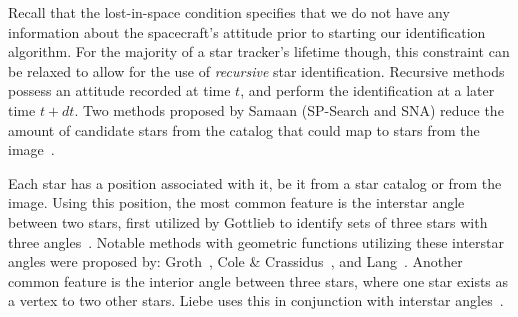 Recall that the lost-in-space condition specifies that we do not have any information about the spacecraft's attitude
prior to starting our identification algorithm.
For the majority of a star tracker's lifetime though, this constraint can be relaxed to allow for the use of
\textit{recursive} star identification.
Recursive methods possess an attitude recorded at time $t$, and perform the identification at a later time $t + dt$.
Two methods proposed by Samaan (SP-Search and SNA) reduce the amount of candidate stars from the catalog that could
map to stars from the image~\cite{samaan:recursiveMode}.

Each star has a position associated with it, be it from a star catalog or from the image.
Using this position, the most common feature is the interstar angle between two stars, first utilized by Gottlieb to
identify sets of three stars with three angles~\cite{gottlieb:spacecraftAttitudeDetermination}.
Notable methods with geometric functions utilizing these interstar angles were proposed by:
Groth~\cite{groth:patternMatchingMethod}, Cole \&
Crassidus~\cite{coleAndCrassidis:sphericalTriangleMethod,coleAndCrassidis:planarTriangleMethod}, and
Lang~\cite{lang:astrometryDotNet}.
Another common feature is the interior angle between three stars, where one star exists as a vertex to two other stars.
Liebe uses this in conjunction with interstar angles~\cite{liebe:starTrackersAttitudeDetermination}.


